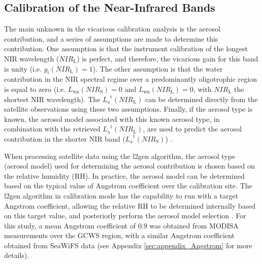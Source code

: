\documentclass[]{interact}
\theoremstyle{plain}%
\theoremstyle{definition}
\theoremstyle{remark}
\begin{document}

\subsection{Calibration of the Near-Infrared Bands}
\label{sec:vcal_nir}
The main unknown in the vicarious calibration analysis is the aerosol contribution, and a series of assumptions are made to determine this contribution. One assumption is that the instrument calibration of the longest NIR wavelength ($NIR_\text{L}$) is perfect, and therefore, the vicarious gain for this band is unity (i.e. $g_i(NIR_\text{L})=1$). The other assumption is that the water contribution in the NIR spectral regime over a predominantly oligotrophic region is equal to zero (i.e. $L_\text{wn}(NIR_\text{S})=0$ and $L_\text{wn}(NIR_\text{L})=0$, with $NIR_\text{L}$ the shortest NIR wavelength). The ${L_\text{a}}^\text{t}(NIR_\text{L})$ can be determined directly from the satellite observations using these two assumptions. Finally, if the aerosol type is known, the aerosol model associated with this known aerosol type, in combination with the retrieved ${L_\text{a}}^\text{t}(NIR_\text{L})$, are used to predict the aerosol contribution in the shorter NIR band (${L_\text{a}}^\text{t}(NIR_\text{S})$) \citep{Franz:07}. 

When processing satellite data using the l2gen algorithm, the aerosol type (aerosol model) used for determining the aerosol contribution is chosen based on the relative humidity (RH). In practice, the aerosol model can be determined based on the typical value of Angstrom coefficient over the calibration site. The l2gen algorithm in calibration mode has the capability to run with a target Angstrom coefficient, allowing the relative RH to be determined internally based on this target value, and posteriorly perform the aerosol model selection \citep{Ahmad2010,Mobley2016}. For this study, a mean Angstrom coefficient of $0.9$ was obtained from MODISA measurements over the GCWS region, with a similar Angstrom coefficient obtained from SeaWiFS data (see Appendix \ref{sec:appendix_Angstrom} for more details).
\end{document}
